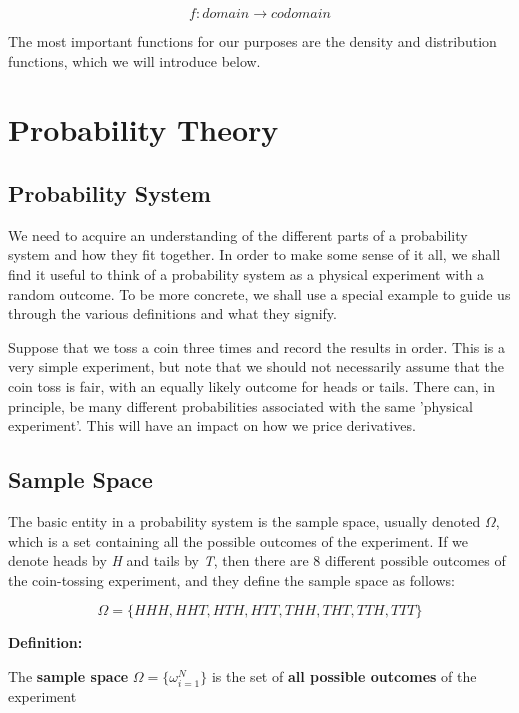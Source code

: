 \documentclass[12pt]{article}
\begin{document}
\begin{equation}
f:domain \longrightarrow codomain
\end{equation}

The most important functions for our purposes are the density and distribution functions, which we will introduce below.
\section{Probability Theory}

\subsection{Probability System}

We need to acquire an understanding of the different parts of a probability system and how they fit together. In order to make some sense of it all, we shall find it useful to think of a probability system as a physical experiment with a random outcome. To be more concrete, we shall use a special example to guide us through the various definitions and what they signify.

Suppose that we toss a coin three times and record the results in order. This is a very simple experiment, but note that we should not necessarily assume that the coin toss is fair, with an equally likely outcome for heads or tails. There can, in principle, be many different probabilities associated with the same 'physical experiment'. This will have an impact on how we price derivatives.

\subsection{Sample Space}

The basic entity in a probability system is the sample space, usually denoted $\Omega$, which is a set containing all the possible outcomes of the experiment. If we denote heads by \textit{H} and tails by \textit{T}, then there are 8 different possible outcomes of the coin-tossing experiment, and they define the sample space as follows:

\begin{equation}
\Omega=\{HHH,HHT,HTH,HTT,THH,THT,TTH,TTT\}
\end{equation}

\textbf{Definition:}

The \textbf{sample space} $\Omega=\{\omega_{i=1}^{N}\}$ is the set of \textbf{all possible outcomes} of the experiment
\end{document}
